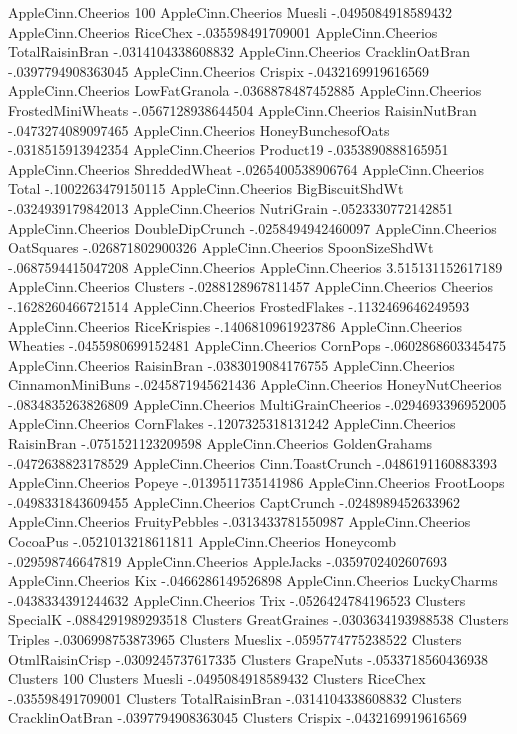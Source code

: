 AppleCinn.Cheerios	100%
AppleCinn.Cheerios	Muesli	-.0495084918589432
AppleCinn.Cheerios	RiceChex	-.035598491709001
AppleCinn.Cheerios	TotalRaisinBran	-.0314104338608832
AppleCinn.Cheerios	CracklinOatBran	-.0397794908363045
AppleCinn.Cheerios	Crispix	-.0432169919616569
AppleCinn.Cheerios	LowFatGranola	-.0368878487452885
AppleCinn.Cheerios	FrostedMiniWheats	-.0567128938644504
AppleCinn.Cheerios	RaisinNutBran	-.0473274089097465
AppleCinn.Cheerios	HoneyBunchesofOats	-.0318515913942354
AppleCinn.Cheerios	Product19	-.0353890888165951
AppleCinn.Cheerios	ShreddedWheat	-.0265400538906764
AppleCinn.Cheerios	Total	-.1002263479150115
AppleCinn.Cheerios	BigBiscuitShdWt	-.0324939179842013
AppleCinn.Cheerios	NutriGrain	-.0523330772142851
AppleCinn.Cheerios	DoubleDipCrunch	-.0258494942460097
AppleCinn.Cheerios	OatSquares	-.026871802900326
AppleCinn.Cheerios	SpoonSizeShdWt	-.0687594415047208
AppleCinn.Cheerios	AppleCinn.Cheerios	3.515131152617189
AppleCinn.Cheerios	Clusters	-.0288128967811457
AppleCinn.Cheerios	Cheerios	-.1628260466721514
AppleCinn.Cheerios	FrostedFlakes	-.1132469646249593
AppleCinn.Cheerios	RiceKrispies	-.1406810961923786
AppleCinn.Cheerios	Wheaties	-.0455980699152481
AppleCinn.Cheerios	CornPops	-.0602868603345475
AppleCinn.Cheerios	RaisinBran	-.0383019084176755
AppleCinn.Cheerios	CinnamonMiniBuns	-.0245871945621436
AppleCinn.Cheerios	HoneyNutCheerios	-.0834835263826809
AppleCinn.Cheerios	MultiGrainCheerios	-.0294693396952005
AppleCinn.Cheerios	CornFlakes	-.1207325318131242
AppleCinn.Cheerios	RaisinBran	-.0751521123209598
AppleCinn.Cheerios	GoldenGrahams	-.0472638823178529
AppleCinn.Cheerios	Cinn.ToastCrunch	-.0486191160883393
AppleCinn.Cheerios	Popeye	-.0139511735141986
AppleCinn.Cheerios	FrootLoops	-.0498331843609455
AppleCinn.Cheerios	CaptCrunch	-.0248989452633962
AppleCinn.Cheerios	FruityPebbles	-.0313433781550987
AppleCinn.Cheerios	CocoaPus	-.0521013218611811
AppleCinn.Cheerios	Honeycomb	-.029598746647819
AppleCinn.Cheerios	AppleJacks	-.0359702402607693
AppleCinn.Cheerios	Kix	-.0466286149526898
AppleCinn.Cheerios	LuckyCharms	-.0438334391244632
AppleCinn.Cheerios	Trix	-.0526424784196523
Clusters	SpecialK	-.0884291989293518
Clusters	GreatGraines	-.0303634193988538
Clusters	Triples	-.0306998753873965
Clusters	Mueslix	-.0595774775238522
Clusters	OtmlRaisinCrisp	-.0309245737617335
Clusters	GrapeNuts	-.0533718560436938
Clusters	100%
Clusters	Muesli	-.0495084918589432
Clusters	RiceChex	-.035598491709001
Clusters	TotalRaisinBran	-.0314104338608832
Clusters	CracklinOatBran	-.0397794908363045
Clusters	Crispix	-.0432169919616569
